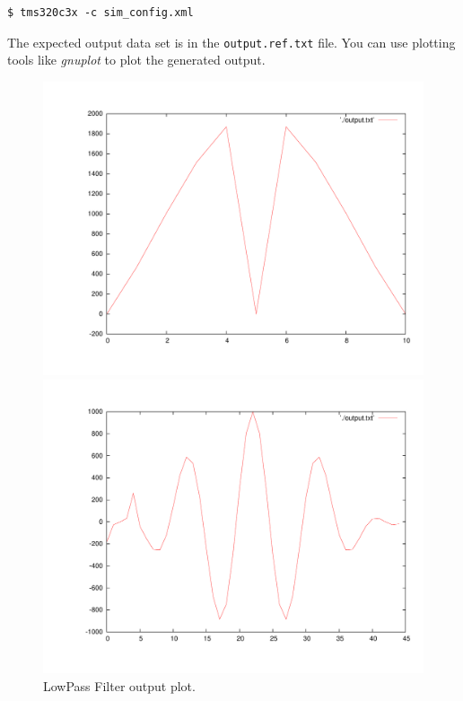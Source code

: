 \begin{verbatim}
$ tms320c3x -c sim_config.xml
\end{verbatim}

The expected output data set is in the \texttt{output.ref.txt} file.
You can use plotting tools like \textit{gnuplot} to plot the generated output. 

\begin{figure}[!h]
	\begin{center}
		\begin{minipage}{\textwidth}
			\begin{center}
			\begin{minipage}{.45\textwidth}
				\begin{center}
					\includegraphics[width=\textwidth]{tms320c3x/fig_lp_output.pdf}
					\caption{\label{fig:tms320c3x_manual_lp_output} LowPass Filter output plot.}
				\end{center}
			\end{minipage}
			\begin{minipage}{.45\textwidth}
				\begin{center}
					\includegraphics[width=\textwidth]{tms320c3x/fig_bp_output.pdf}

\end{center}
\end{minipage}
\end{center}
\end{minipage}
\end{center}
\end{figure}
